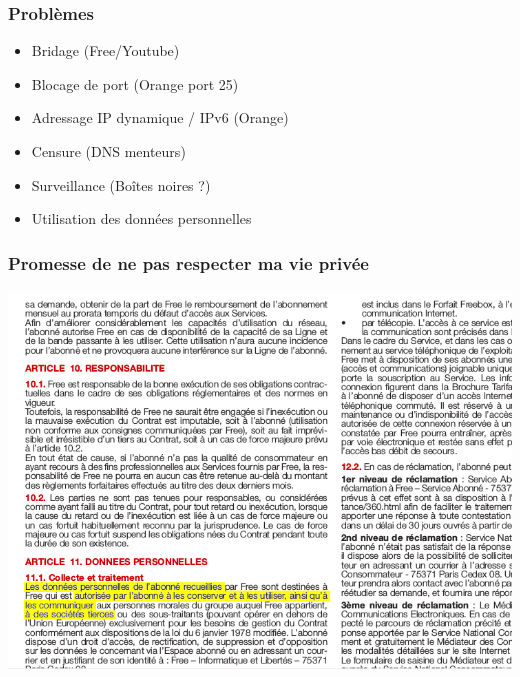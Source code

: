 \documentclass[notes=hide]{beamer}
\begin{document}
\begin{frame}
\frametitle{\textcolor{titre}{Problèmes}}
  \begin{itemize}
    \item Bridage (Free/Youtube)
      \pause
    \item Blocage de port (Orange port 25)
      \pause
    \item Adressage IP dynamique / IPv6 (Orange)
      \pause
    \item Censure (DNS menteurs)
      \pause
    \item Surveillance (Boîtes noires ?)
      \pause
    \item Utilisation des données personnelles
  \end{itemize}
\end{frame}

\begin{frame}[t]
		  \frametitle{\textcolor{titre}{Promesse de ne pas respecter ma vie privée}}
\begin{center}
\vfill
\includegraphics[width=.75\textwidth]{img2/03g-cgu.png}
\vfill
\end{center}
\end{frame}
\end{document}
